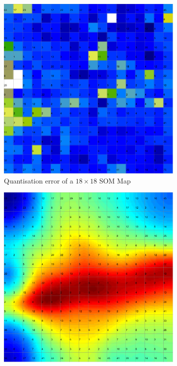 \documentclass{acm_proc_article-sp}
\begin{document}
\begin{figure}
\begin{subfigure}[b]{0.45\linewidth}
    \includegraphics[width=\linewidth]{img/wine-mid-mean-quant-error}
    \caption{Quantisation error of a $18\times18$ SOM Map}
    \label{fig:wine-mid-mean-quant-error}
\end{subfigure}
\begin{subfigure}[b]{0.45\linewidth}
    \includegraphics[width=\linewidth]{img/wine-mid-p-matrix}

\end{subfigure}
\end{figure}
\end{document}
